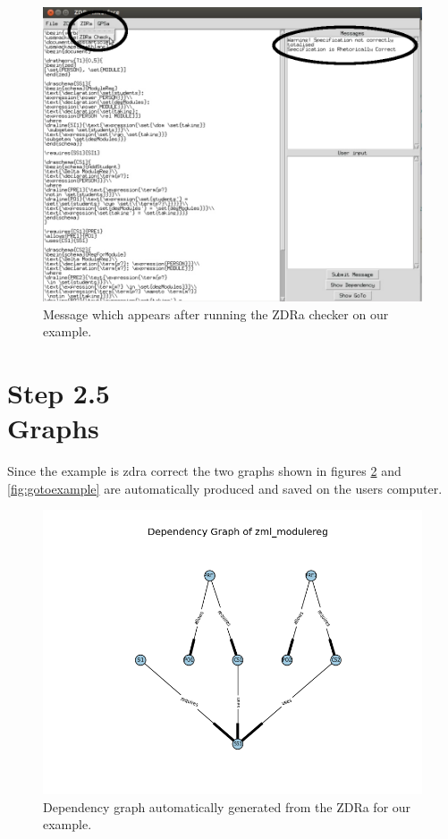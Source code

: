 \begin{figure}[H]
\centering
\includegraphics[scale=0.3]{Figures/fullexample/zdracorrect.png}
\caption{Message which appears after running the ZDRa checker on our example. \label{fig:zdracorrect}}
\end{figure}

\section{Step 2.5\\Graphs}

Since the example is \gls{zdra} correct the two graphs shown in figures
\ref{fig:depexample} and \ref{fig:gotoexample} are automatically produced and
saved on the users computer.

\begin{figure}[H]
\centering
\includegraphics[scale=0.55]{Figures/fullexample/dp_fullexample.png}
\caption{Dependency graph automatically generated from the ZDRa for our example. \label{fig:depexample}}
\end{figure}

